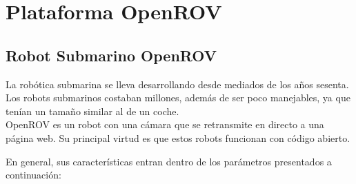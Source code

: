 \chapter{Plataforma OpenROV}
\label{cap:plataformaOpenROV}

\section{Robot Submarino OpenROV}
\label{cap:Robot Submarino OpenROV}
La robótica submarina se lleva desarrollando desde mediados de los años sesenta. Los robots submarinos costaban millones, además de ser poco manejables, ya que tenían un tamaño similar al de un coche. 
\\OpenROV\cite{openrov} es un robot con una cámara que se retransmite en directo a una página web. Su principal virtud es que estos robots funcionan con código abierto.

En general, sus características entran dentro de los parámetros presentados a continuación:

